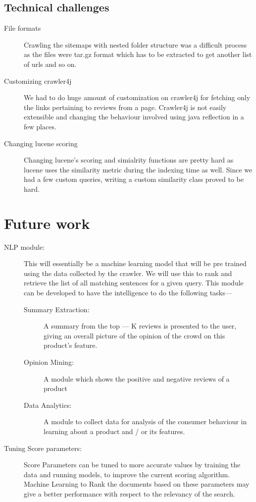 \documentclass{article}
\begin{document}
\subsection{Technical challenges}
\begin{description}
  \item[File formats] Crawling the sitemaps with nested folder structure was a difficult process as the files were tar.gz format which has to be extracted to get another list of urls and so on.
  \item[Customizing crawler4j] We had to do huge amount of customization on crawler4j for fetching only the links pertaining to reviews from a page.  Crawler4j is not easily extensible and changing the behaviour involved using java reflection in a few places.
  \item[Changing lucene scoring]  Changing lucene's scoring and simialrity functions are pretty hard as lucene uses the similarity metric during the indexing time as well.  Since we had a few custom queries, writing a custom similarity class proved to be hard.
\end{description}


\section{Future work}
\begin{description}
  \item[NLP module:] This will essentially be a machine learning model that will be pre trained using the data collected by the crawler. We will use this to rank and retrieve the list of all matching sentences for a given query. This module can be developed to have the intelligence to do the following tasks---
	\begin{description}
		\item[Summary Extraction: ] A summary from the top --- K reviews is presented to the user, giving an overall picture of the opinion of the crowd on this product's feature. 
		\item[Opinion Mining:] A module which shows the positive and negative reviews of a product
		\item[Data Analytics:] A module to collect data for analysis of the consumer behaviour in learning about a product and / or its features.
	\end{description}
 \item[Tuning Score parameters: ] Score Parameters can be tuned to more accurate values by training the data and running models, to improve the current scoring algorithm. Machine Learning to Rank the documents based on these parameters  may give a better performance with respect to the relevancy of the search.

\end{description}



\end{document}
